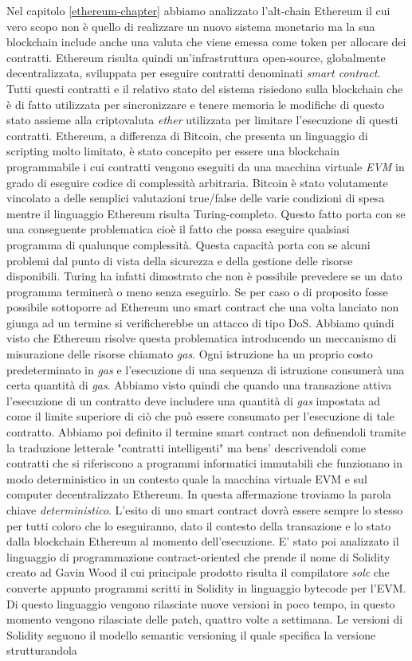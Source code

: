 Nel capitolo \ref{ethereum-chapter} abbiamo analizzato l'alt-chain Ethereum il cui vero scopo non è quello di realizzare un nuovo sistema monetario ma la sua blockchain include anche una valuta che viene emessa come token per allocare dei contratti. Ethereum risulta quindi un'infrastruttura open-source, globalmente decentralizzata, sviluppata per eseguire contratti denominati \textit{smart contract}. Tutti questi contratti e il relativo stato del sistema risiedono sulla blockchain che è di fatto utilizzata per sincronizzare e tenere memoria le modifiche di questo stato assieme alla criptovaluta \textit{ether} utilizzata per limitare l'esecuzione di questi contratti. Ethereum, a differenza di Bitcoin, che presenta un linguaggio di scripting molto limitato, è stato concepito per essere una blockchain programmabile i cui contratti vengono eseguiti da una macchina virtuale \textit{EVM} in grado di eseguire codice di complessità arbitraria. Bitcoin è stato volutamente vincolato a delle semplici valutazioni true/false delle varie condizioni di spesa mentre il linguaggio Ethereum risulta Turing-completo. Questo fatto porta con se una conseguente problematica cioè il fatto che possa eseguire qualsiasi programma di qualunque complessità. Questa capacità porta con se alcuni problemi dal punto di vista della sicurezza e della gestione delle risorse disponibili. Turing ha infatti dimostrato che non è possibile prevedere se un dato programma terminerà o meno senza eseguirlo. Se per caso o di proposito fosse possibile sottoporre ad Ethereum uno smart contract che una volta lanciato non giunga ad un termine si verificherebbe un attacco di tipo DoS. Abbiamo quindi visto che Ethereum risolve questa problematica introducendo un meccanismo di misurazione delle risorse chiamato \textit{gas}. Ogni istruzione ha un proprio costo predeterminato in \textit{gas} e l'esecuzione di una sequenza di istruzione consumerà una certa quantità di \textit{gas}. Abbiamo visto quindi che quando una transazione attiva l'esecuzione di un contratto deve includere una quantità di \textit{gas} impostata ad come il limite superiore di ciò che può essere consumato per l'esecuzione di tale contratto. Abbiamo poi definito il termine smart contract non definendoli tramite la traduzione letterale "contratti intelligenti" ma bens' descrivendoli come contratti che si riferiscono a programmi informatici immutabili che funzionano in modo deterministico in un contesto quale la macchina virtuale EVM e sul computer decentralizzato Ethereum. In questa affermazione troviamo la parola chiave \textit{deterministico}. L'esito di uno smart contract dovrà essere sempre lo stesso per tutti coloro che lo eseguiranno, dato il contesto della transazione e lo stato dalla blockchain Ethereum al momento dell'esecuzione. E' stato poi analizzato il linguaggio di programmazione contract-oriented che prende il nome di Solidity creato ad Gavin Wood il cui principale prodotto risulta il compilatore \textit{solc} che converte appunto programmi scritti in Solidity in linguaggio bytecode per l'EVM. Di questo linguaggio vengono rilasciate nuove versioni in poco tempo, in questo momento vengono rilasciate delle patch, quattro volte a settimana. Le versioni di Solidity seguono il modello semantic versioning il quale specifica la versione strutturandola 